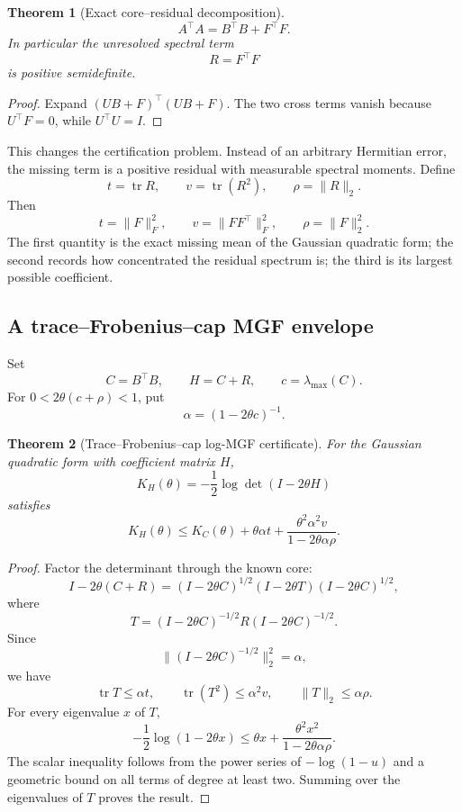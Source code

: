 \documentclass[11pt]{article}
\newtheorem{theorem}{Theorem}[section]
\theoremstyle{definition}
\theoremstyle{remark}
\begin{document}
\begin{theorem}[Exact core--residual decomposition]
\[
\boxed{
A^\top A
=
B^\top B+F^\top F.
}
\]
In particular the unresolved spectral term
\[
R=F^\top F
\]
is positive semidefinite.
\end{theorem}

\begin{proof}
Expand \((UB+F)^\top(UB+F)\).  The two cross terms vanish because
\(U^\top F=0\), while \(U^\top U=I\).
\end{proof}

This changes the certification problem.  Instead of an arbitrary Hermitian
error, the missing term is a positive residual with measurable spectral
moments.  Define
\[
t=\operatorname{tr}R,
\qquad
v=\operatorname{tr}(R^2),
\qquad
\rho=\|R\|_2.
\]
Then
\[
\boxed{
 t=\|F\|_F^2,
 \qquad
 v=\|FF^\top\|_F^2,
 \qquad
 \rho=\|F\|_2^2.
}
\]
The first quantity is the exact missing mean of the Gaussian quadratic form;
the second records how concentrated the residual spectrum is; the third is its
largest possible coefficient.

\subsection{A trace--Frobenius--cap MGF envelope}

Set
\[
C=B^\top B,
\qquad
H=C+R,
\qquad
c=\lambda_{\max}(C).
\]
For \(0<2\theta(c+\rho)<1\), put
\[
\alpha=(1-2\theta c)^{-1}.
\]

\begin{theorem}[Trace--Frobenius--cap log-MGF certificate]
For the Gaussian quadratic form with coefficient matrix \(H\),
\[
K_H(\theta)
=-\frac12\log\det(I-2\theta H)
\]
satisfies
\[
\boxed{
K_H(\theta)
\le
K_C(\theta)
+
\theta\alpha t
+
\frac{\theta^2\alpha^2v}
     {1-2\theta\alpha\rho}.
}
\]
\end{theorem}

\begin{proof}
Factor the determinant through the known core:
\[
I-2\theta(C+R)
=
(I-2\theta C)^{1/2}
(I-2\theta T)
(I-2\theta C)^{1/2},
\]
where
\[
T=(I-2\theta C)^{-1/2}
R
(I-2\theta C)^{-1/2}.
\]
Since
\[
\|(I-2\theta C)^{-1/2}\|_2^2=\alpha,
\]
we have
\[
\operatorname{tr}T\le\alpha t,
\qquad
\operatorname{tr}(T^2)\le\alpha^2v,
\qquad
\|T\|_2\le\alpha\rho.
\]
For every eigenvalue \(x\) of \(T\),
\[
-\frac12\log(1-2\theta x)
\le
\theta x
+
\frac{\theta^2x^2}
     {1-2\theta\alpha\rho}.
\]
The scalar inequality follows from the power series of \(-\log(1-u)\) and a
geometric bound on all terms of degree at least two.  Summing over the
eigenvalues of \(T\) proves the result.
\end{proof}
\end{document}
